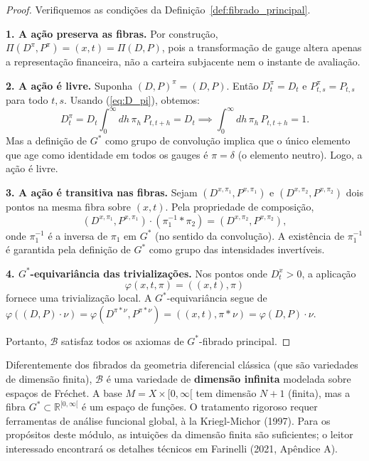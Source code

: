 \begin{proof}
Verifiquemos as condi\c{c}\~oes da Defini\c{c}\~ao~\ref{def:fibrado_principal}.

\textbf{1. A a\c{c}\~ao preserva as fibras.} Por constru\c{c}\~ao,
$\Pi(D^\pi, P^\pi) = (x, t) = \Pi(D, P)$, pois a transforma\c{c}\~ao de
gauge altera apenas a representa\c{c}\~ao financeira, n\~ao a carteira
subjacente nem o instante de avalia\c{c}\~ao.

\textbf{2. A a\c{c}\~ao \'e livre.} Suponha $(D,P)^\pi = (D,P)$. Ent\~ao
$D_t^\pi = D_t$ e $P_{t,s}^\pi = P_{t,s}$ para todo $t, s$. Usando
(\ref{eq:D_pi}), obtemos:
\begin{equation}
 D_t^\pi = D_t \int_0^\infty dh \, \pi_h \, P_{t,t+h} = D_t
 \implies \int_0^\infty dh \, \pi_h \, P_{t,t+h} = 1.
\end{equation}
Mas a defini\c{c}\~ao de $G^*$ como grupo de convolu\c{c}\~ao implica que
o \'unico elemento que age como identidade em todos os gauges \'e
$\pi = \delta$ (o elemento neutro). Logo, a a\c{c}\~ao \'e livre.

\textbf{3. A a\c{c}\~ao \'e transitiva nas fibras.} Sejam
$(D^{x,\pi_1}, P^{x,\pi_1})$ e $(D^{x,\pi_2}, P^{x,\pi_2})$ dois pontos
na mesma fibra sobre $(x,t)$. Pela propriedade de composi\c{c}\~ao,
\begin{equation}
 (D^{x,\pi_1}, P^{x,\pi_1}) \cdot (\pi_1^{-1} * \pi_2)
 = (D^{x,\pi_2}, P^{x,\pi_2}),
\end{equation}
onde $\pi_1^{-1}$ \'e a inversa de $\pi_1$ em $G^*$ (no sentido da
convolu\c{c}\~ao). A exist\^encia de $\pi_1^{-1}$ \'e garantida pela
defini\c{c}\~ao de $G^*$ como grupo das intensidades invert\'iveis.

\textbf{4. $G^*$-equivari\^ancia das trivializa\c{c}\~oes.} Nos pontos onde
$D_t^x > 0$, a aplica\c{c}\~ao
\begin{equation}
 \varphi(x,t,\pi) = ((x,t), \pi)
\end{equation}
fornece uma trivializa\c{c}\~ao local. A $G^*$-equivari\^ancia segue de
$\varphi((D,P) \cdot \nu) = \varphi(D^{\pi * \nu}, P^{\pi * \nu})
= ((x,t), \pi * \nu) = \varphi(D,P) \cdot \nu$.

Portanto, $\mathcal{B}$ satisfaz todos os axiomas de $G^*$-fibrado principal.
\end{proof}

\begin{obs}
Diferentemente dos fibrados da geometria diferencial cl\'assica (que s\~ao
variedades de dimens\~ao finita), $\mathcal{B}$ \'e uma variedade de
\textbf{dimens\~ao infinita} modelada sobre espa\c{c}os de Fr\'echet. A base
$M = X \times [0,\infty[$ tem dimens\~ao $N+1$ (finita), mas a fibra
$G^* \subset \mathbb{R}^{[0,\infty[}$ \'e um espa\c{c}o de fun\c{c}\~oes.
O tratamento rigoroso requer ferramentas de an\'alise funcional global,
\`a la Kriegl-Michor (1997). Para os prop\'ositos deste m\'odulo, as
intui\c{c}\~oes da dimens\~ao finita s\~ao suficientes; o leitor interessado
encontrar\'a os detalhes t\'ecnicos em Farinelli (2021, Ap\^endice A).
\end{obs}

